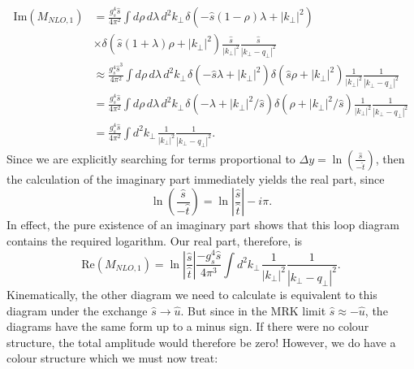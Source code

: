 \begin{equation}
\begin{split}
\text{Im}(M_{NLO,1}) & = \frac{g_s^4 \hat{s}}{ 4 \pi^2} \int d \rho \hspace{2pt} d \lambda \hspace{2pt} d^2 k_\perp \hspace{1pt} \delta(-\hat{s}(1-\rho) \lambda + |k_\perp|^2) \\
& \times \delta(\hat{s}(1+ \lambda) \rho + |k_\perp|^2) \frac{\hat{s}}{|k_\perp|^2} \frac{\hat{s}}{|k_\perp - q_\perp|^2}  \\
& \approx \frac{g_s^4 \hat{s}^3}{ 4 \pi^2} \int d \rho \hspace{2pt} d \lambda \hspace{2pt} d^2 k_\perp \hspace{1pt} \delta(-\hat{s} \lambda + |k_\perp|^2) \delta(\hat{s} \rho + |k_\perp|^2) \frac{1}{|k_\perp|^2} \frac{1}{|k_\perp - q_\perp|^2}  \\
&= \frac{g_s^4 \hat{s}}{ 4 \pi^2} \int d \rho \hspace{2pt} d \lambda \hspace{2pt} d^2 k_\perp \hspace{1pt} \delta(-\lambda + |k_\perp|^2/\hat{s}) \delta(\rho + |k_\perp|^2/\hat{s}) \frac{1}{|k_\perp|^2} \frac{1}{|k_\perp - q_\perp|^2} \\
&= \frac{g_s^4 \hat{s}}{ 4 \pi^2} \int d^2 k_\perp \hspace{1pt}  \frac{1}{|k_\perp|^2} \frac{1}{|k_\perp - q_\perp|^2}.
\end{split}
\end{equation}
Since we are explicitly searching for terms proportional to $\Delta y = \ln \left( \frac{\hat{s}}{-\hat{t}} \right)$, then the calculation of the imaginary part immediately yields the real part, since
\begin{equation}
\ln \left( \frac{\hat{s}}{-\hat{t}} \right) = \ln \left| \frac{\hat{s}}{\hat{t}} \right| - i \pi.
\end{equation}
In effect, the pure existence of an imaginary part shows that this loop diagram contains the required logarithm. Our real part, therefore, is
\begin{equation}
\text{Re}(M_{NLO,1}) = \ln \left| \frac{\hat{s}}{\hat{t}} \right| \frac{-g_s^4 \hat{s}}{ 4 \pi^3} \int d^2 k_\perp \hspace{1pt}  \frac{1}{|k_\perp|^2} \frac{1}{|k_\perp - q_\perp|^2}.
\end{equation}
Kinematically, the other diagram we need to calculate is equivalent to this diagram under the exchange $\hat{s} \to \hat{u}$. But since in the MRK limit $\hat{s} \approx -\hat{u}$, the diagrams have the same form up to a minus sign. If there were no colour structure, the total amplitude would therefore be zero! However, we do have a colour structure which we must now treat:
